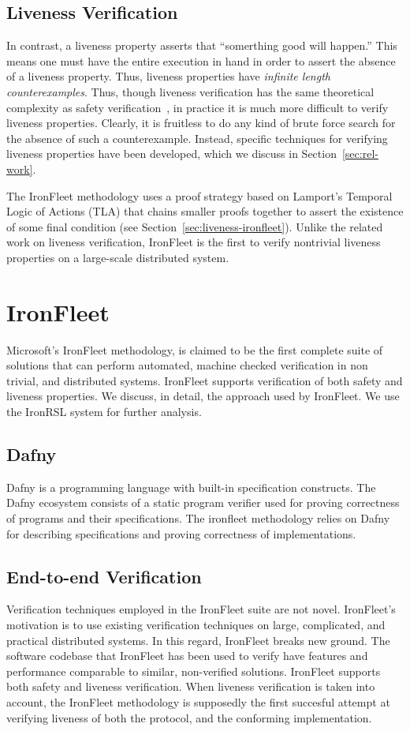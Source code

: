 \documentclass{llncs}
\begin{document}
\subsection{Liveness Verification}\label{sec:liveness-description}
In contrast, a liveness property asserts that ``somerthing good will happen.''
This means one must have the entire execution in hand in order to assert the
absence of a liveness property. Thus, liveness properties have \textit{infinite
  length counterexamples}.  Thus, though liveness verification has the same
theoretical complexity as safety verification~\cite{simulation-liveness}, in
practice it is much more difficult to verify liveness properties. Clearly, it is
fruitless to do any kind of brute force search for the absence of such a
counterexample. Instead, specific techniques for verifying liveness properties
have been developed, which we discuss in Section~\ref{sec:rel-work}.

The IronFleet methodology uses a proof strategy based on Lamport's Temporal
Logic of Actions (TLA) that chains smaller proofs together to assert the
existence of some final condition (see
Section~\ref{sec:liveness-ironfleet}). Unlike the related work on liveness
verification, IronFleet is the first to verify nontrivial liveness properties on
a large-scale distributed system.
%
\section{IronFleet}
Microsoft's IronFleet methodology, is claimed to be the first complete suite of 
solutions that can perform automated, machine checked verification 
in non trivial, and distributed systems. IronFleet supports 
verification of both safety and liveness properties. We discuss, in detail, the 
approach used by IronFleet. We use the IronRSL system for further analysis.

\subsection{Dafny}
Dafny is a programming language with built-in specification constructs. The Dafny
ecosystem consists of a static program verifier used for proving correctness of
programs and their specifications. The ironfleet methodology relies 
on Dafny for describing specifications and proving correctness of implementations. 

\subsection{End-to-end Verification}
Verification techniques employed in the IronFleet suite are not novel. IronFleet's 
motivation is to use existing verification techniques on large, complicated, and practical distributed
systems. In this regard, IronFleet breaks new ground. The software codebase that IronFleet
has been used to verify have features and performance comparable to similar, non-verified solutions. 
IronFleet supports both safety and liveness verification. When liveness verification is taken into account, 
the IronFleet methodology is supposedly the first succesful attempt at verifying liveness of both
the protocol, and the conforming implementation. 
\end{document}
